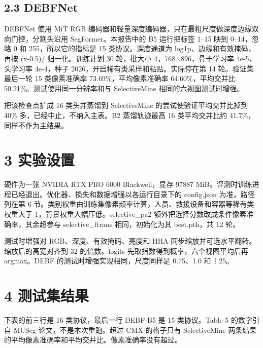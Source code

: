 \documentclass[11pt]{article}
\begin{document}
\subsection*{2.3 DEBFNet}
DEBFNet 使用 MiT RGB 编码器和轻量深度编码器，只在最粗尺度做深度边缘双向门控，分割头沿用 SegFormer。本报告中的 B5 运行把标签 1–15 映到 0–14，忽略 0 和 255，所以它的指标是 15 类协议。深度通道为 log1p、边缘和有效掩码，再按 (x-0.5)/ 归一化。训练计划 30 轮，批大小 4，768×896，骨干学习率 4e-5，头学习率 4e-4，种子 2026，开启稀有类采样和粘贴。实际停在第 14 轮。验证集最后一轮 15 类像素准确率 73.69\%，平均像素准确率 64.60\%，平均交并比 50.21\%。测试使用同一分辨率和与 SelectiveMine 相同的六视图测试时增强。

把该检查点扩成 16 类头并蒸馏到 SelectiveMine 的尝试使验证平均交并比掉到 40\% 多，已经中止，不纳入主表。B2 蒸馏轨迹最高 16 类平均交并比约 41.7\%，同样不作为主结果。

\section*{3 实验设置}
硬件为一张 NVIDIA RTX PRO 6000 Blackwell，显存 97887 MiB。评测时训练进程已经退出。优化器、损失和数据增强以各运行目录下的 config.json 为准，路径列在第 6 节。类别权重由训练集像素频率计算，人员、救援设备和容器等稀有类权重大于 1，背景权重大幅压低。selective\_\allowbreak pa2 额外把选择分数改成条件像素准确率，其余超参与 selective\_\allowbreak ftrans 相同，初始化为其 best.pth，共 12 轮。

测试时增强对 RGB、深度、有效掩码、亮度和 HHA 同步缩放并可选水平翻转。缩放后的高宽对齐到 32 的倍数。logits 先取指数得到概率，六个视图平均后再 argmax。DEBF 的测试时增强实现相同，尺度同样是 0.75、1.0 和 1.25。

\section*{4 测试集结果}
下表的前三行是 16 类协议，最后一行 DEBF-B5 是 15 类协议。Table 5 的数字引自 MUSeg 论文，不是本次重跑。超过 CMX 的格子只有 SelectiveMine 两条结果的平均像素准确率和平均交并比。像素准确率没有超过。
\end{document}
